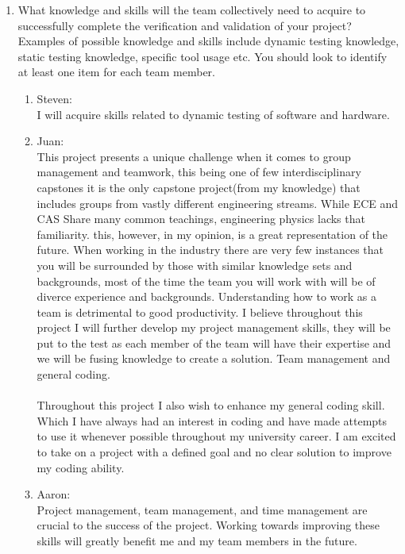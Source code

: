 \documentclass[12pt, titlepage]{article}
\begin{document}
\begin{enumerate}
  \item What knowledge and skills will the team collectively need to acquire to
  successfully complete the verification and validation of your project?
  Examples of possible knowledge and skills include dynamic testing knowledge,
  static testing knowledge, specific tool usage etc.  You should look to
  identify at least one item for each team member.

  \begin{enumerate}
    \item{Steven:}\\
    I will acquire skills related to dynamic testing of software and hardware. \\
    \item{Juan:}\\
    This project presents a unique challenge when it comes to group management and teamwork, this being one of few interdisciplinary capstones it is the only 
    capstone project(from my knowledge) that includes groups from vastly different engineering streams. While ECE and CAS Share many common teachings, engineering physics lacks that familiarity.
    this, however, in my opinion, is a great representation of the future. When working in the industry there are very few instances that you will be surrounded by those with similar knowledge sets 
    and backgrounds, most of the time the team you will work with will be of diverce experience and backgrounds. Understanding how to work as a team is detrimental to good productivity. I believe throughout this 
    project I will further develop my project management skills, they will be put to the test as each member of the team will have their expertise and we will be fusing knowledge to create a solution.
    Team management and general coding.\\
    \\
    Throughout this project I also wish to enhance my general coding skill. Which I have always had an interest in coding and have made attempts to use it whenever possible throughout my university career. I am excited to 
    take on a project with a defined goal and no clear solution to improve my coding ability.
    \item{Aaron:}\\
    Project management, team management, and time management are 
    crucial to the success of the project. Working towards improving these skills will
    greatly benefit me and my team members in the future.\\

\end{enumerate}
\end{enumerate}
\end{document}
